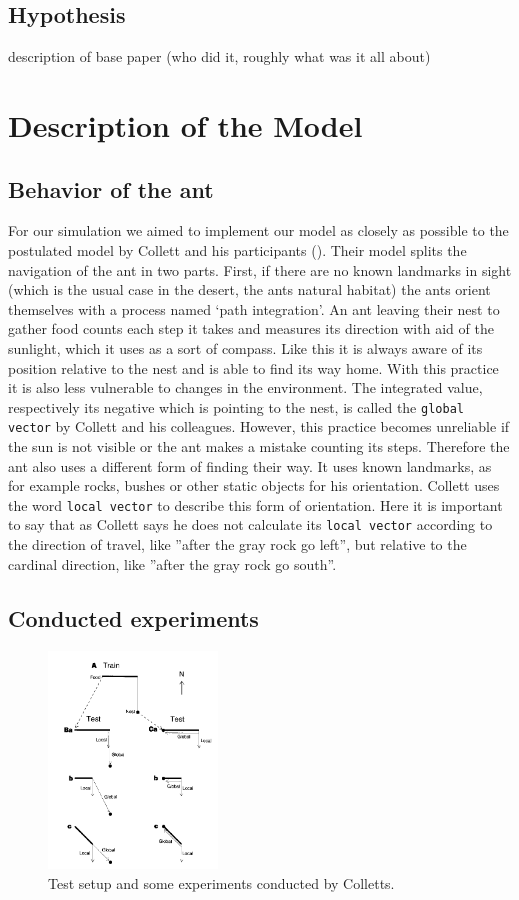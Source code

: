 \documentclass[11pt]{article}
\begin{document}
	\subsection{Hypothesis}
		description of base paper (who did it, roughly what was it all about)
\section{Description of the Model} %
	\subsection{Behavior of the ant}
		For our simulation we aimed to implement our model as closely as possible to the postulated model by Collett and his participants (\cite{wehner}). Their model splits the navigation of the ant in two parts. First, if there are no known landmarks in sight  (which is the usual case in the desert, the ants natural habitat) the ants orient themselves with a process named `path integration'. An ant leaving their nest to gather food counts each step it takes and measures its direction with aid of the sunlight, which it uses as a sort of compass. Like this it is always aware of its position relative to the nest and is able to find its way home. With this practice it is also less vulnerable to changes in the environment. The integrated value, respectively its negative which is pointing to the nest, is called the \texttt{global vector} by Collett and his colleagues. However, this practice becomes unreliable if the sun is not visible or the ant makes a mistake counting its steps. Therefore the ant also uses a different form of finding their way. It uses known landmarks, as for example rocks, bushes or other static objects for his orientation. Collett uses the word \texttt{local vector} to describe this form of orientation. Here it is important to say that as Collett says he does not calculate its \texttt{local vector} according to the direction of travel, like ''after the gray rock go left'', but relative to the cardinal direction, like ''after the gray rock go south''.
	\subsection{Conducted experiments}
	
\begin{figure}
	\includegraphics[width=0.4\textwidth]{experiments_setup.png}
	\caption{Test setup and some experiments conducted by Colletts. \cite{wehner}}
	\label{fig:setup}
\end{figure}
\end{document}
